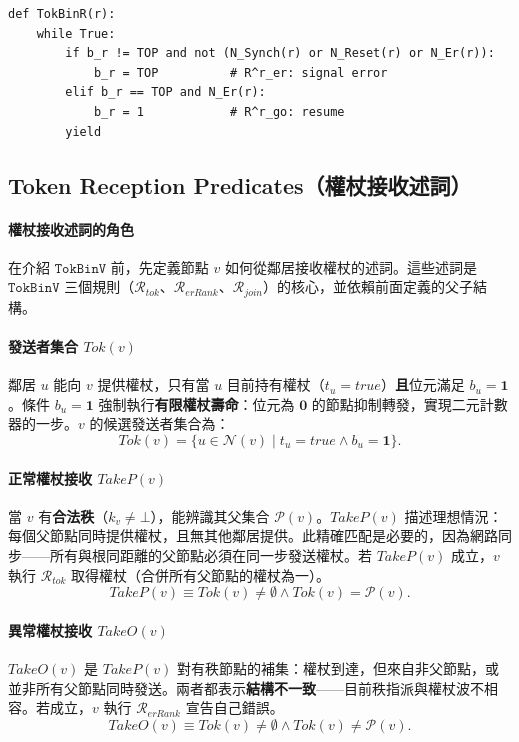 \documentclass[a4paper, 12pt]{article}
\newcommand{\Pa}{\mathcal{P}}
\newcommand{\bz}{\mathbf{0}}
\newcommand{\bo}{\mathbf{1}}
\newcommand{\rk}{k}
\newcommand{\RerRank}{\mathscr{R}_{erRank}}
\newcommand{\Rjoin}{\mathscr{R}_{join}}
\newcommand{\Rtok}{\mathscr{R}_{tok}}
\begin{document}
\begin{lstlisting}[caption={\(\mathtt{TokBinR}\) (root \(r\))}, label={algo:TokBinR-py}]
def TokBinR(r):
    while True:
        if b_r != TOP and not (N_Synch(r) or N_Reset(r) or N_Er(r)):
            b_r = TOP          # R^r_er: signal error
        elif b_r == TOP and N_Er(r):
            b_r = 1            # R^r_go: resume
        yield
\end{lstlisting}

\subsection{Token Reception Predicates（權杖接收述詞）}
\label{subsec:token-predicates}

\paragraph{權杖接收述詞的角色}
在介紹 \(\mathtt{TokBinV}\) 前，先定義節點 \(v\) 如何從鄰居接收權杖的述詞。這些述詞是 \(\mathtt{TokBinV}\) 三個規則（\(\Rtok\)、\(\RerRank\)、\(\Rjoin\)）的核心，並依賴前面定義的父子結構。

\paragraph{發送者集合 \(\mathit{Tok}(v)\)}
鄰居 \(u\) 能向 \(v\) 提供權杖，只有當 \(u\) 目前持有權杖（\(t_u=\mathit{true}\)）\textbf{且}位元滿足 \(b_u=\bo\)。條件 \(b_u=\bo\) 強制執行\textbf{有限權杖壽命}：位元為 \(\bz\) 的節點抑制轉發，實現二元計數器的一步。\(v\) 的候選發送者集合為：
\[
\mathit{Tok}(v)=\{u\in\mathcal{N}(v)\mid t_u=\mathit{true}\wedge b_u=\bo\}.
\]

\paragraph{正常權杖接收 \(\mathit{TakeP}(v)\)}
當 \(v\) 有\textbf{合法秩}（\(\rk_v\neq\bot\)），能辨識其父集合 \(\Pa(v)\)。\(\mathit{TakeP}(v)\) 描述理想情況：每個父節點同時提供權杖，且無其他鄰居提供。此精確匹配是必要的，因為網路同步——所有與根同距離的父節點必須在同一步發送權杖。若 \(\mathit{TakeP}(v)\) 成立，\(v\) 執行 \(\Rtok\) 取得權杖（合併所有父節點的權杖為一）。
\[
\mathit{TakeP}(v)\equiv \mathit{Tok}(v)\neq\emptyset\wedge \mathit{Tok}(v)=\Pa(v).
\]

\paragraph{異常權杖接收 \(\mathit{TakeO}(v)\)}
\(\mathit{TakeO}(v)\) 是 \(\mathit{TakeP}(v)\) 對有秩節點的補集：權杖到達，但來自非父節點，或並非所有父節點同時發送。兩者都表示\textbf{結構不一致}——目前秩指派與權杖波不相容。若成立，\(v\) 執行 \(\RerRank\) 宣告自己錯誤。
\[
\mathit{TakeO}(v)\equiv \mathit{Tok}(v)\neq\emptyset\wedge \mathit{Tok}(v)\neq\Pa(v).
\]
\end{document}
